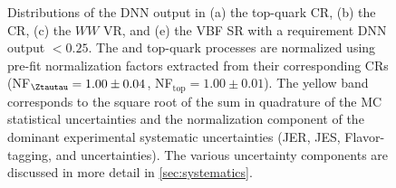 \begin{figure}[ht]
{            \label{fig:dnn:dnn-val-in-crs-c}
        } 
        {\caption{Distributions of the DNN output in (a) the top-quark CR, (b) the \Ztautau CR, (c) the $WW$ VR, and (e) the VBF SR with a requirement DNN output $<0.25$. The \Ztautau and top-quark processes are normalized using pre-fit normalization factors extracted from their corresponding CRs (NF$_{\Ztautau} = 1.00 \pm 0.04$, NF$_{\text{top}} = 1.00 \pm 0.01$). The yellow band corresponds to the square root of the sum in quadrature of the MC statistical uncertainties and the normalization component of the dominant experimental systematic uncertainties (JER, JES, Flavor-tagging, and \MET uncertainties). The various uncertainty components are discussed in more detail in \cref{sec:systematics}.
                \label{fig:dnn:dnn-val-in-crs} }}
    \end{figure}


    \newcommand{\srdnnlowplotdir}{figures/220605-Thesis/sr/dnn25-scaledvbf-nfs3x3/plots}
    
